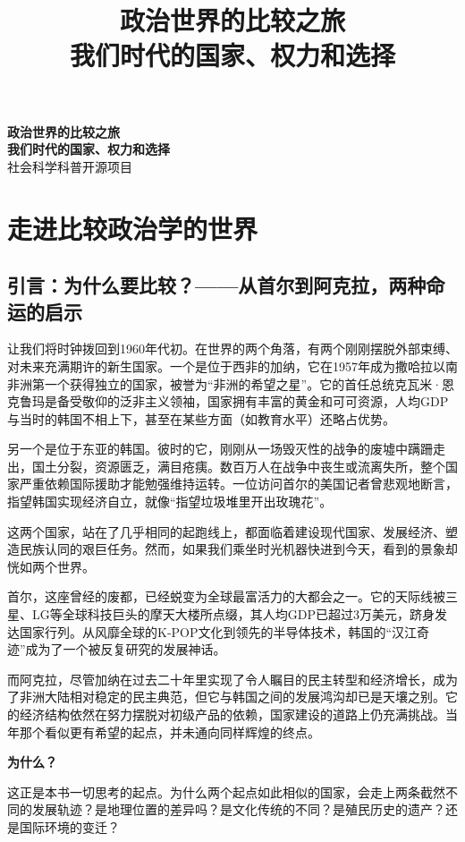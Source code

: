 \documentclass[a5paper, 11pt, openany]{ctexbook}
\title{
    {\Huge\bfseries\songti 政治世界的比较之旅}\\[1cm]
    {\LARGE\songti 我们时代的国家、权力和选择}
}
\author{} %
\date{}   %
\newcommand{\publisher}{社会科学科普开源项目} %
\newcommand{\publisher}{社会科学科普开源项目组} %
\renewcommand{\maketitle}{
    \begin{titlepage}
        \thispagestyle{empty} %
        \centering
        \vspace*{\stretch{1.5}}
        {\huge\bfseries\songti 政治世界的比较之旅}\\[1cm]
        {\large\bfseries\songti 我们时代的国家、权力和选择}\\[1cm] %

        \vfill %
        {\large \publisher} %
    \end{titlepage}
}
\begin{document}
\frontmatter %
\pagestyle{fancy} %
\maketitle
\tableofcontents

\mainmatter %
\pagestyle{fancy} %

\part{走进比较政治学的世界}

\chapter{引言：为什么要比较？——从首尔到阿克拉，两种命运的启示}

让我们将时钟拨回到1960年代初。在世界的两个角落，有两个刚刚摆脱外部束缚、对未来充满期许的新生国家。一个是位于西非的加纳，它在1957年成为撒哈拉以南非洲第一个获得独立的国家，被誉为“非洲的希望之星”。它的首任总统克瓦米·恩克鲁玛是备受敬仰的泛非主义领袖，国家拥有丰富的黄金和可可资源，人均GDP与当时的韩国不相上下，甚至在某些方面（如教育水平）还略占优势。

另一个是位于东亚的韩国。彼时的它，刚刚从一场毁灭性的战争的废墟中蹒跚走出，国土分裂，资源匮乏，满目疮痍。数百万人在战争中丧生或流离失所，整个国家严重依赖国际援助才能勉强维持运转。一位访问首尔的美国记者曾悲观地断言，指望韩国实现经济自立，就像“指望垃圾堆里开出玫瑰花”。

这两个国家，站在了几乎相同的起跑线上，都面临着建设现代国家、发展经济、塑造民族认同的艰巨任务。然而，如果我们乘坐时光机器快进到今天，看到的景象却恍如两个世界。

首尔，这座曾经的废都，已经蜕变为全球最富活力的大都会之一。它的天际线被三星、LG等全球科技巨头的摩天大楼所点缀，其人均GDP已超过3万美元，跻身发达国家行列。从风靡全球的K-POP文化到领先的半导体技术，韩国的“汉江奇迹”成为了一个被反复研究的发展神话。

而阿克拉，尽管加纳在过去二十年里实现了令人瞩目的民主转型和经济增长，成为了非洲大陆相对稳定的民主典范，但它与韩国之间的发展鸿沟却已是天壤之别。它的经济结构依然在努力摆脱对初级产品的依赖，国家建设的道路上仍充满挑战。当年那个看似更有希望的起点，并未通向同样辉煌的终点。

\textbf{为什么？}

这正是本书一切思考的起点。为什么两个起点如此相似的国家，会走上两条截然不同的发展轨迹？是地理位置的差异吗？是文化传统的不同？是殖民历史的遗产？还是国际环境的变迁？
\end{document}
